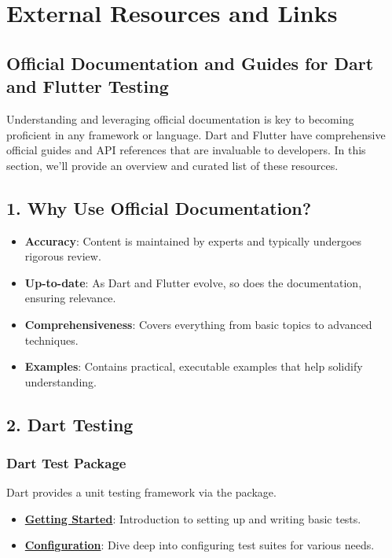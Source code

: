\section{External Resources and Links}
\subsection{Official Documentation and Guides for Dart and Flutter Testing}

Understanding and leveraging official documentation is key to becoming proficient in any framework or language. 
Dart and Flutter have comprehensive official guides and API references that are invaluable to developers. 
In this section, we'll provide an overview and curated list of these resources.

\subsection*{1. Why Use Official Documentation?}

\begin{itemize}
 \item \textbf{Accuracy}: Content is maintained by experts and typically undergoes rigorous review.
 \item \textbf{Up-to-date}: As Dart and Flutter evolve, so does the documentation, ensuring relevance.
 \item \textbf{Comprehensiveness}: Covers everything from basic topics to advanced techniques.
 \item \textbf{Examples}: Contains practical, executable examples that help solidify understanding.
\end{itemize}

\subsection*{2. Dart Testing}

\subsubsection*{Dart Test Package}

Dart provides a unit testing framework via the \href{https://pub.dev/packages/test}{} package.

\begin{itemize}
 \item \href{https://pub.dev/packages/test#-readme-tab-}{\textbf{Getting Started}}: Introduction to setting up and writing basic tests.
 \item \href{https://github.com/dart-lang/test/blob/master/pkgs/test/doc/configuration.md}{\textbf{Configuration}}: Dive deep into configuring test suites for various needs.
\end{itemize}

